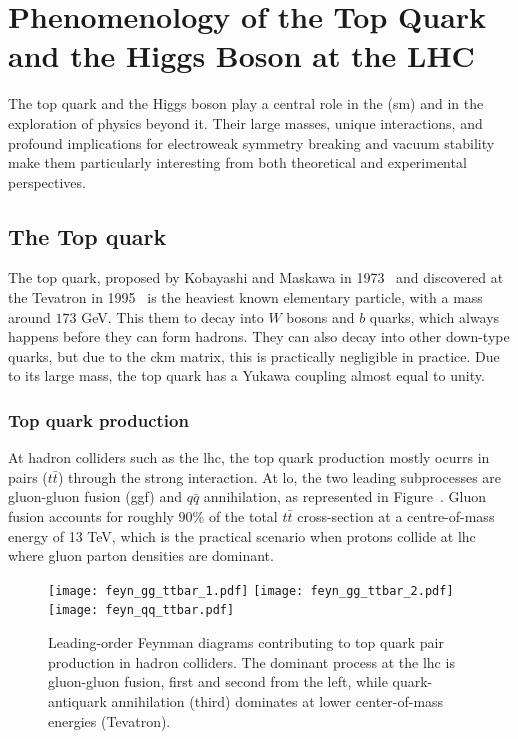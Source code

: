 \section{Phenomenology of the Top Quark and the Higgs Boson at the LHC}
\label{sec:top_higgs_lhc}
The top quark and the Higgs boson play a central role in the (\acrshort{sm}) and in the exploration of physics beyond it. Their large masses, unique interactions, and profound implications for electroweak symmetry breaking and vacuum stability make them particularly interesting from both theoretical and experimental perspectives. 

\subsection{The Top quark}
\label{sec:top_quark}

The top quark, proposed by Kobayashi and Maskawa in 1973~\cite{10.1143/PTP.49.652} and discovered at the Tevatron in 1995~\cite{PhysRevLett.74.2626,PhysRevLett.74.2632} is the heaviest known elementary particle, with a mass around $173$ GeV. This them to decay into $W$ bosons and $b$ quarks, which always happens before they can form hadrons. They can also decay into other down-type quarks, but due to the \acrshort{ckm} matrix, this is practically negligible in practice. Due to its large mass, the top quark has a Yukawa coupling almost equal to unity.

\subsubsection*{Top quark production}
\label{subsec:top_quark_prod}
At hadron colliders such as the \acrshort{lhc}, the top quark production mostly ocurrs in pairs ($t\bar{t}$) through the strong interaction. At \acrshort{lo}, the two leading subprocesses are gluon-gluon fusion (\acrshort{ggf}) and $q\bar{q}$ annihilation, as represented in Figure~\cite{fig:tt-production}. Gluon fusion accounts for roughly $90\%$ of the total $t\bar{t}$ cross-section at a centre-of-mass energy of 13 TeV, which is the practical scenario when protons collide at \acrshort{lhc} where gluon parton densities are dominant. 
\begin{figure}[htbp]
    \centering


        \centering
        \texttt{[image: feyn\_gg\_ttbar\_1.pdf]}
        \texttt{[image: feyn\_gg\_ttbar\_2.pdf]}
        \texttt{[image: feyn\_qq\_ttbar.pdf]}
    

    \caption{Leading-order Feynman diagrams contributing to top quark pair production in hadron colliders. The dominant process at the \acrshort{lhc} is gluon-gluon fusion, first and second from the left, while quark-antiquark annihilation (third) dominates at lower center-of-mass energies (Tevatron).}
    \label{fig:tt-production}
\end{figure}

